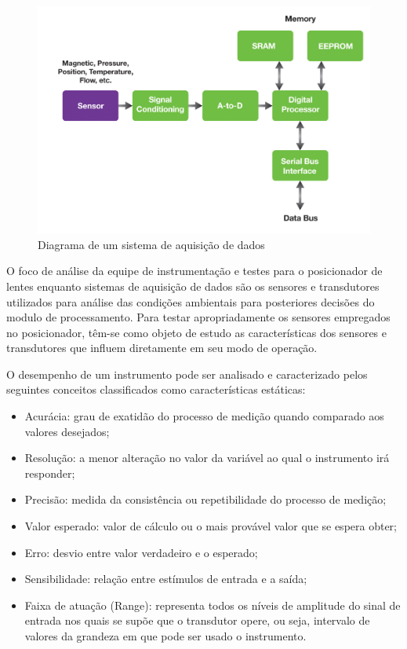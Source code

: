 \begin{figure}[H]
		\centering
			\includegraphics[scale=1.0]{figuras/diagramadados.png}
		\caption{Diagrama de um sistema de aquisição de dados}
		\label{dados}
\end{figure}

O foco de análise da equipe de instrumentação e testes para o posicionador de lentes enquanto sistemas de aquisição de dados são os sensores e transdutores utilizados para análise das condições ambientais para posteriores decisões do modulo de processamento. Para testar apropriadamente os sensores empregados no posicionador, têm-se como objeto de estudo as características dos sensores e transdutores que influem diretamente em seu modo de operação.

O desempenho de um instrumento pode ser analisado e caracterizado pelos seguintes conceitos classificados como características estáticas:
\begin{itemize}
\item Acurácia: grau de exatidão do processo de medição quando comparado aos valores desejados;
\item Resolução: a menor alteração no valor da variável ao qual o instrumento irá responder;
\item Precisão: medida da consistência ou repetibilidade do processo de medição;
\item Valor esperado: valor de cálculo ou o mais provável valor que se espera obter;
\item Erro: desvio entre valor verdadeiro e o esperado;
\item Sensibilidade: relação entre estímulos de entrada e a saída;
\item Faixa de atuação (Range): representa todos os níveis de amplitude do sinal de entrada nos quais se supõe que o transdutor opere, ou seja, intervalo de valores da grandeza em que pode ser usado o instrumento.
\end{itemize}

